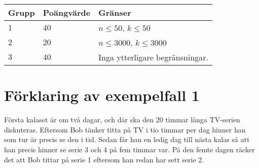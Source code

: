 \noindent
\begin{tabular}{| l | l | p{12cm} |}
  \hline
  Grupp & Poängvärde & Gränser \\ \hline
    $1$   & $40$     & $n \leq 50$, $k \leq 50$ \\ \hline
    $2$   & $20$     & $n \leq 3000$, $k \leq 3000$ \\ \hline
    $3$   & $40$     & Inga ytterligare begränsningar. \\ \hline
\end{tabular}


\section*{Förklaring av exempelfall 1}
Första kalaset är om två dagar, och där ska den 20 timmar långa TV-serien diskuteras. Eftersom Bob tänker titta på TV i tio timmar per dag hinner han som tur är precis se den i tid. Sedan får han en ledig dag till nästa kalas så att han precis hinner se serie 3 och 4 på fem timmar var. På den femte dagen räcker det att Bob tittar på serie 1 eftersom han redan har sett serie 2.

